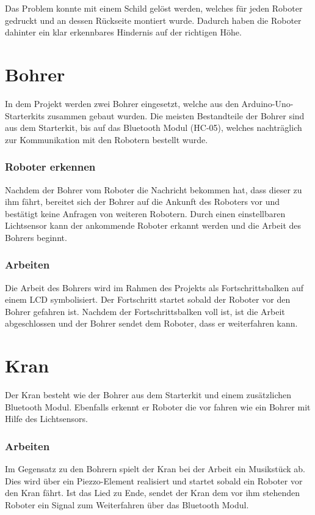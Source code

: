 Das Problem konnte mit einem Schild gelöst werden, welches für jeden Roboter gedruckt und an dessen Rückseite montiert wurde. Dadurch haben die Roboter dahinter ein klar erkennbares Hindernis auf der richtigen Höhe.

\section{Bohrer}
In dem Projekt werden zwei Bohrer eingesetzt, welche aus den Arduino-Uno-Starterkits zusammen gebaut wurden. Die meisten Bestandteile der Bohrer sind aus dem Starterkit, bis auf das Bluetooth Modul (HC-05), welches nachträglich zur Kommunikation mit den Robotern bestellt wurde.

\subsubsection{Roboter erkennen}
Nachdem der Bohrer vom Roboter die Nachricht bekommen hat, dass dieser zu ihm fährt, bereitet sich der Bohrer auf die Ankunft des Roboters vor und bestätigt keine Anfragen von weiteren Robotern. Durch einen einstellbaren Lichtsensor kann der ankommende Roboter erkannt werden und die Arbeit des Bohrers beginnt.

\subsubsection{Arbeiten}
Die Arbeit des Bohrers wird im Rahmen des Projekts als Fortschrittsbalken auf einem LCD symbolisiert. Der Fortschritt startet sobald der Roboter vor den Bohrer gefahren ist. Nachdem der Fortschrittsbalken voll ist, ist die Arbeit abgeschlossen und der Bohrer sendet dem Roboter, dass er weiterfahren kann.

\section{Kran}
Der Kran besteht wie der Bohrer aus dem Starterkit und einem zusätzlichen Bluetooth Modul. Ebenfalls erkennt er Roboter die vor fahren wie ein Bohrer mit Hilfe des Lichtsensors.
\subsubsection{Arbeiten}
Im Gegensatz zu den Bohrern spielt der Kran bei der Arbeit ein Musikstück ab. Dies wird über ein Piezzo-Element realisiert und startet sobald ein Roboter vor den Kran fährt. Ist das Lied zu Ende, sendet der Kran dem vor ihm stehenden Roboter ein Signal zum Weiterfahren über das Bluetooth Modul.

